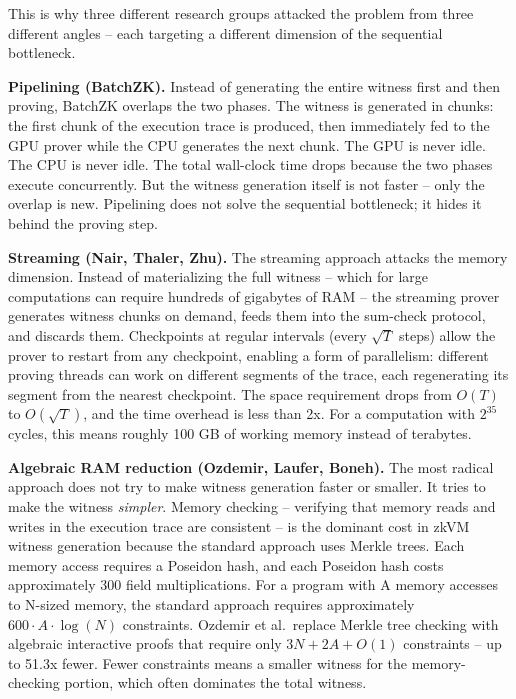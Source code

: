 \documentclass[
  11pt,
  openany]{report}
\renewcommand{\textbf}[1]{{\bfseries\color{MidnightBold}#1}}
\begin{document}
This is why three different research groups attacked the problem from three
different angles -- each targeting a different dimension of the sequential
bottleneck.

\textbf{Pipelining (BatchZK).} Instead of generating the entire witness first
and then proving, BatchZK overlaps the two phases. The witness is generated in
chunks: the first chunk of the execution trace is produced, then immediately fed
to the GPU prover while the CPU generates the next chunk. The GPU is never idle.
The CPU is never idle. The total wall-clock time drops because the two phases
execute concurrently. But the witness generation itself is not faster -- only
the overlap is new. Pipelining does not solve the sequential bottleneck; it
hides it behind the proving step.

\textbf{Streaming (Nair, Thaler, Zhu).} The streaming approach attacks the
memory dimension. Instead of materializing the full witness -- which for large
computations can require hundreds of gigabytes of RAM -- the streaming prover
generates witness chunks on demand, feeds them into the sum-check protocol, and
discards them. Checkpoints at regular intervals (every \(\sqrt{T}\) steps) allow
the prover to restart from any checkpoint, enabling a form of parallelism:
different proving threads can work on different segments of the trace, each
regenerating its segment from the nearest checkpoint. The space requirement
drops from \(O(T)\) to \(O(\sqrt{T})\), and the time overhead is less than 2x.
For a computation with \(2^{35}\) cycles, this means roughly 100 GB of working
memory instead of terabytes.

\textbf{Algebraic RAM reduction (Ozdemir, Laufer, Boneh).} The most radical
approach does not try to make witness generation faster or smaller. It tries to
make the witness \emph{simpler}. Memory checking -- verifying that memory reads
and writes in the execution trace are consistent -- is the dominant cost in zkVM
witness generation because the standard approach uses Merkle trees. Each memory
access requires a Poseidon hash, and each Poseidon hash costs approximately 300
field multiplications. For a program with A memory accesses to N-sized memory,
the standard approach requires approximately \(600 \cdot A \cdot \log(N)\)
constraints. Ozdemir et al.~replace Merkle tree checking with algebraic
interactive proofs that require only \(3N + 2A + O(1)\) constraints -- up to
51.3x fewer. Fewer constraints means a smaller witness for the memory-checking
portion, which often dominates the total witness.
\end{document}
